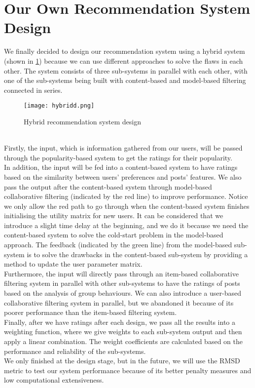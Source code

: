 \section{Our Own Recommendation System Design}
We finally decided to design our recommendation system using a hybrid system (shown in \cref{hybridd}) because we can use different approaches to solve the flaws in each other. The system consists of three sub-systems in parallel with each other, with one of the sub-systems being built with content-based and model-based filtering connected in series.
\begin{figure}[ht]
  \centering
  \texttt{[image: hybridd.png]}
  \caption{Hybrid recommendation system design}
  \label{hybridd}
  \end{figure}
\\Firstly, the input, which is information gathered from our users, will be passed through the popularity-based system to get the ratings for their popularity.
\\In addition, the input will be fed into a content-based system to have ratings based on the similarity between users' preferences and posts' features. 
We also pass the output after the content-based system through model-based collaborative filtering (indicated by the red line) to improve performance. Notice we only allow the red path to go through when the content-based system finishes initialising the utility matrix for new users. It can be considered that we introduce a slight time delay at the beginning, and we do it because we need the content-based system to solve the cold-start problem in the model-based approach. The feedback (indicated by the green line) from the model-based sub-system is to solve the drawbacks in the content-based sub-system by providing a method to update the user parameter matrix.
\\Furthermore, the input will directly pass through an item-based collaborative filtering system in parallel with other sub-systems 
to have the ratings of posts based on the analysis of group behaviours. We can also introduce a user-based collaborative filtering system in parallel, but we abandoned it because of its poorer performance than the item-based filtering system.
\\Finally, after we have ratings after each design, we pass all the results into a weighting function, where we give weights to each sub-system output and then apply a linear combination.
The weight coefficients are calculated based on the performance and reliability of the sub-systems.
\\We only finished at the design stage, but in the future, we will use the RMSD metric to test our system performance because of its better penalty measures and low computational extensiveness. 

